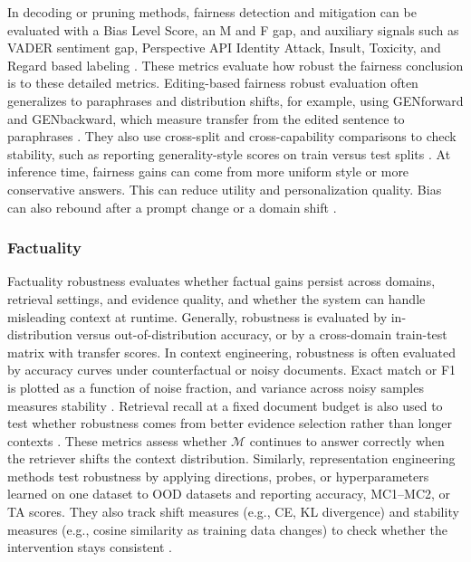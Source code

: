 In decoding or pruning methods, fairness detection and mitigation can be evaluated with a Bias Level Score, an M and F gap, and auxiliary signals such as VADER sentiment gap, Perspective API Identity Attack, Insult, Toxicity, and Regard based labeling \citep{DBLP:journals/corr/abs-2408-03907, DBLP:conf/emnlp/XuG0BS24, zayed2024fairness, dasu2025attention}.
These metrics evaluate how robust the fairness conclusion is to these detailed metrics.
Editing-based fairness robust evaluation often generalizes to paraphrases and distribution shifts, for example, using GENforward and GENbackward, which measure transfer from the edited sentence to paraphrases \citep{yan2024potential}. They also use cross-split and cross-capability comparisons to check stability, such as reporting generality-style scores on train versus test splits \citep{qin2024mitigating, cai2024locating}. At inference time, fairness gains can come from more uniform style or more conservative answers. This can reduce utility and personalization quality.
Bias can also rebound after a prompt change or a domain shift \citep{kamruzzaman2024prompting, dhingra2023queer}.


\subsubsection{Factuality}
Factuality robustness evaluates whether factual gains persist across domains, retrieval settings, and evidence quality, and whether the system can handle misleading context at runtime. Generally, robustness is evaluated by in-distribution versus out-of-distribution accuracy, or by a cross-domain train-test matrix with transfer scores. In context engineering, robustness is often evaluated by accuracy curves under counterfactual or noisy documents. Exact match or F1 is plotted as a function of noise fraction, and variance across noisy samples measures stability \citep{wan2024dell, press2023measuring, dhuliawala2024chain, yu2023generate, chen2024improving}. Retrieval recall at a fixed document budget is also used to test whether robustness comes from better evidence selection rather than longer contexts \citep{zhou2024metacognitive, asai2024self, yu2023generate}. These metrics assess whether $\mathcal{M}$ continues to answer correctly when the retriever shifts the context distribution. Similarly, representation engineering methods test robustness by applying directions, probes, or hyperparameters learned on one dataset to OOD datasets and reporting accuracy, MC1–MC2, or TA scores. \citep{wang2024act, zou2023representation, bayat2024enhanced, wang2024act} They also track shift measures (e.g., CE, KL divergence) and stability measures (e.g., cosine similarity as training data changes) to check whether the intervention stays consistent \citep{li2023iti, hoscilowicz2024nliti, li2023iti}.   

